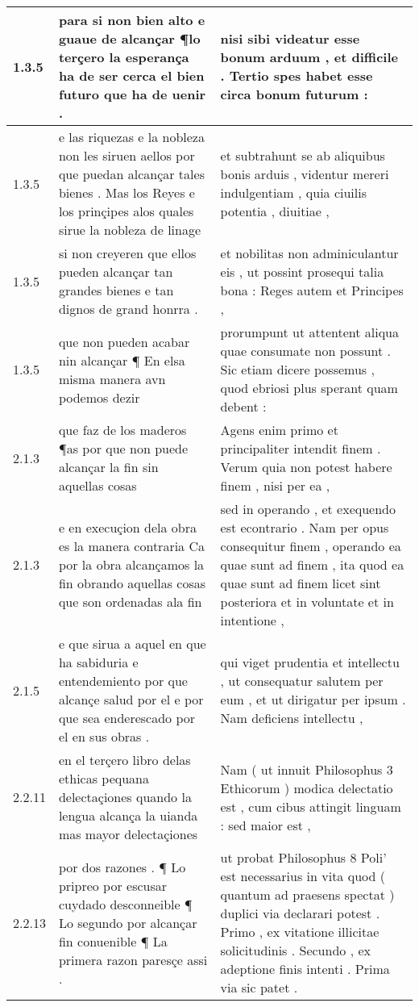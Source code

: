 \begin{tabular}{|p{1cm}|p{6.5cm}|p{6.5cm}|}
1.3.5 & para si non bien alto e guaue de alcançar ¶lo terçero la esperança ha de ser cerca el bien futuro que ha de uenir . & nisi sibi videatur esse bonum arduum , et difficile . Tertio spes habet esse circa bonum futurum : \\\hline
1.3.5 & e las riquezas e la nobleza non les siruen aellos por que puedan alcançar tales bienes . Mas los Reyes e los prinçipes alos quales sirue la nobleza de linage & et subtrahunt se ab aliquibus bonis arduis , videntur mereri indulgentiam , quia ciuilis potentia , diuitiae , \\\hline
1.3.5 & si non creyeren que ellos pueden alcançar tan grandes bienes e tan dignos de grand honrra . & et nobilitas non adminiculantur eis , ut possint prosequi talia bona : Reges autem et Principes , \\\hline
1.3.5 & que non pueden acabar nin alcançar ¶ En elsa misma manera avn podemos dezir & prorumpunt ut attentent aliqua quae consumate non possunt . Sic etiam dicere possemus , quod ebriosi plus sperant quam debent : \\\hline
2.1.3 & que faz de los maderos ¶as por que non puede alcançar la fin sin aquellas cosas & Agens enim primo et principaliter intendit finem . Verum quia non potest habere finem , nisi per ea , \\\hline
2.1.3 & e en execuçion dela obra es la manera contraria Ca por la obra alcançamos la fin obrando aquellas cosas que son ordenadas ala fin & sed in operando , et exequendo est econtrario . Nam per opus consequitur finem , operando ea quae sunt ad finem , ita quod ea quae sunt ad finem licet sint posteriora et in voluntate et in intentione , \\\hline
2.1.5 & e que sirua a aquel en que ha sabiduria e entendemiento por que alcançe salud por el e por que sea enderescado por el en sus obras . & qui viget prudentia et intellectu , ut consequatur salutem per eum , et ut dirigatur per ipsum . Nam deficiens intellectu , \\\hline
2.2.11 & en el terçero libro delas ethicas pequana delectaçiones quando la lengua alcança la uianda mas mayor delectaçiones & Nam ( ut innuit Philosophus 3 Ethicorum ) modica delectatio est , cum cibus attingit linguam : sed maior est , \\\hline
2.2.13 & por dos razones . ¶ Lo pripreo por escusar cuydado desconneible ¶ Lo segundo por alcançar fin conuenible ¶ La primera razon paresçe assi . & ut probat Philosophus 8 Poli’ est necessarius in vita quod ( quantum ad praesens spectat ) duplici via declarari potest . Primo , ex vitatione illicitae solicitudinis . Secundo , ex adeptione finis intenti . Prima via sic patet . \\\hline

\end{tabular}
